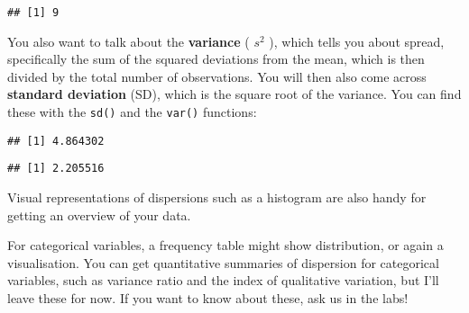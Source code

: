 \documentclass[
]{book}
\newenvironment{Shaded}{\begin{snugshade}}{\end{snugshade}}
\newcommand{\AttributeTok}[1]{\textcolor[rgb]{0.13,0.29,0.53}{#1}}
\newcommand{\ConstantTok}[1]{\textcolor[rgb]{0.56,0.35,0.01}{#1}}
\newcommand{\FunctionTok}[1]{\textcolor[rgb]{0.13,0.29,0.53}{\textbf{#1}}}
\newcommand{\NormalTok}[1]{#1}
\newcommand{\SpecialCharTok}[1]{\textcolor[rgb]{0.81,0.36,0.00}{\textbf{#1}}}
\begin{document}
\begin{Shaded}
\end{Shaded}

\begin{verbatim}
## [1] 9
\end{verbatim}

You also want to talk about the \textbf{variance} ( \(s^2\) ), which tells you about spread, specifically the sum of the squared deviations from the mean, which is then divided by the total number of observations. You will then also come across \textbf{standard deviation} (SD), which is the square root of the variance. You can find these with the \texttt{sd()} and the \texttt{var()} functions:

\begin{Shaded}
\end{Shaded}

\begin{verbatim}
## [1] 4.864302
\end{verbatim}

\begin{Shaded}
\end{Shaded}

\begin{verbatim}
## [1] 2.205516
\end{verbatim}

Visual representations of dispersions such as a histogram are also handy for getting an overview of your data.

For categorical variables, a frequency table might show distribution, or again a visualisation. You can get quantitative summaries of dispersion for categorical variables, such as variance ratio and the index of qualitative variation, but I'll leave these for now. If you want to know about these, ask us in the labs!
\end{document}
